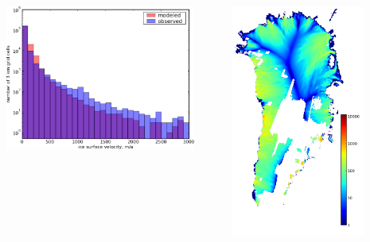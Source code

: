 \documentclass{beamer}
\begin{document}
\begin{frame}
\begin{columns}
\begin{column}{0.6\textwidth}
\begin{center}
  \includegraphics[width=0.9\textwidth]{g3km_3_SIA_hist}
\end{center}
\end{column}
\begin{column}{0.4\textwidth}
\begin{center}
  \includegraphics[width=0.75\textwidth]{g3km_3_SIA}
\end{center}
\end{column}
\end{columns}
\end{frame}
\end{document}
